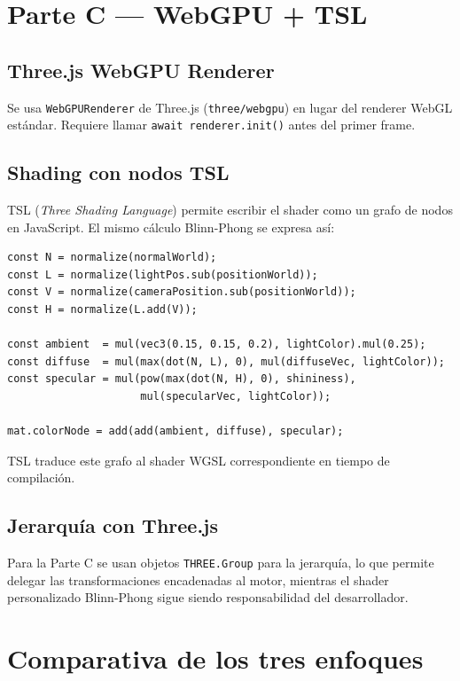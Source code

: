 \documentclass[12pt,a4paper]{article}
\begin{document}
\section{Parte C — WebGPU + TSL}

\subsection{Three.js WebGPU Renderer}

Se usa \texttt{WebGPURenderer} de Three.js (\texttt{three/webgpu}) en lugar del renderer WebGL estándar. Requiere llamar \texttt{await renderer.init()} antes del primer frame.

\subsection{Shading con nodos TSL}

TSL (\textit{Three Shading Language}) permite escribir el shader como un grafo de nodos en JavaScript. El mismo cálculo Blinn-Phong se expresa así:

\begin{lstlisting}[style=glsl, language={}]
const N = normalize(normalWorld);
const L = normalize(lightPos.sub(positionWorld));
const V = normalize(cameraPosition.sub(positionWorld));
const H = normalize(L.add(V));

const ambient  = mul(vec3(0.15, 0.15, 0.2), lightColor).mul(0.25);
const diffuse  = mul(max(dot(N, L), 0), mul(diffuseVec, lightColor));
const specular = mul(pow(max(dot(N, H), 0), shininess),
                     mul(specularVec, lightColor));

mat.colorNode = add(add(ambient, diffuse), specular);
\end{lstlisting}

TSL traduce este grafo al shader WGSL correspondiente en tiempo de compilación.

\subsection{Jerarquía con Three.js}

Para la Parte C se usan objetos \texttt{THREE.Group} para la jerarquía, lo que permite delegar las transformaciones encadenadas al motor, mientras el shader personalizado Blinn-Phong sigue siendo responsabilidad del desarrollador.

\section{Comparativa de los tres enfoques}
\end{document}
